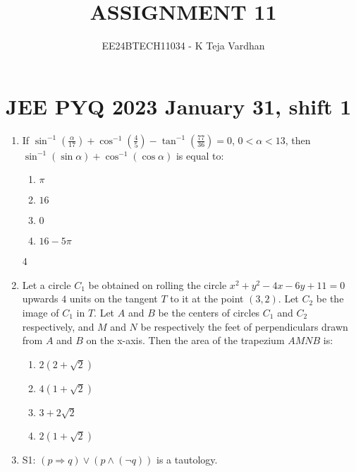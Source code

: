 \documentclass[journal]{IEEEtran}
\newcommand{\brak}[1]{\left( #1 \right)}
\newcommand{\lt}{<}
\begin{document}

\title{ASSIGNMENT 11}
\author{EE24BTECH11034 - K Teja Vardhan}
{\let\newpage\relax\maketitle}

\section{JEE PYQ 2023 January 31, shift 1}
\begin{enumerate}

    \item If $\sin^{-1}\brak{\frac{\alpha}{17}} + \cos^{-1}\brak{\frac{4}{5}} - \tan^{-1}\brak{\frac{77}{36}} = 0$, $0 \lt \alpha \lt 13$, then $\sin^{-1}\brak{\sin \alpha} + \cos^{-1}\brak{\cos \alpha}$ is equal to:
        
        \begin{multicols}{4}
        \begin{enumerate}
        \item $\pi$
        \item $16$
        \item $0$
        \item $16 - 5\pi$
        \end{enumerate}
        \end{multicols}
4
    \item Let a circle $C_{1}$ be obtained on rolling the circle $x^{2}+y^{2}-4x-6y+11=0$ upwards $4$ units on the tangent $T$ to it at the point $\brak{3, 2}$. Let $C_{2}$ be the image of $C_{1}$ in $T$. Let $A$ and $B$ be the centers of circles $C_{1}$ and $C_{2}$ respectively, and $M$ and $N$ be respectively the feet of perpendiculars drawn from $A$ and $B$ on the x-axis. Then the area of the trapezium $AMNB$ is:
    
        \begin{multicols}{4}
        \begin{enumerate}
        \item $2\brak{2+\sqrt{2}}$
        \item $4\brak{1+\sqrt{2}}$
        \item $3+2\sqrt{2}$
        \item $2\brak{1+\sqrt{2}}$
        \end{enumerate}
        \end{multicols}
        
    \item S1: $\brak{p\Rightarrow q}\lor\brak{p\land\brak{\neg q}}$ is a tautology.


\end{enumerate}
\end{document}
